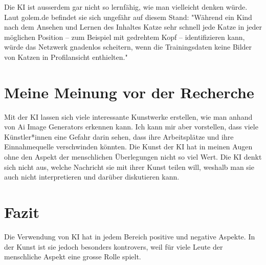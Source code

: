 \documentclass{article}
\begin{document}
    Die KI ist ausserdem gar nicht so lernfähig, wie man vielleicht denken würde. Laut golem.de befindet sie sich 
    ungefähr auf diesem Stand: "Während ein Kind nach dem Ansehen und Lernen des Inhaltes Katze sehr schnell 
    jede Katze in jeder möglichen Position – zum Beispiel mit gedrehtem Kopf – identifizieren kann, würde 
    das Netzwerk gnadenlos scheitern, wenn die Trainingsdaten keine Bilder von Katzen in Profilansicht enthielten." 

\section{Meine Meinung vor der Recherche}
    Mit der KI lassen sich viele interessante Kunstwerke erstellen, wie man anhand von Ai Image 
    Generators erkennen kann. Ich kann mir aber vorstellen, dass viele Künstler*innen eine Gefahr 
    darin sehen, dass ihre Arbeitsplätze und ihre Einnahmequelle verschwinden könnten. Die Kunst der KI 
    hat in meinen Augen ohne den Aspekt der menschlichen Überlegungen nicht so viel Wert. Die KI denkt 
    sich nicht aus, welche Nachricht sie mit ihrer Kunst teilen will, weshalb man sie auch nicht 
    interpretieren und darüber diskutieren kann.

\section{Fazit}
    Die Verwendung von KI hat in jedem Bereich positive und negative Aspekte. In der Kunst ist sie jedoch 
    besonders kontrovers, weil für viele Leute der menschliche Aspekt eine grosse Rolle spielt.



\printbibliography
\end{document}
